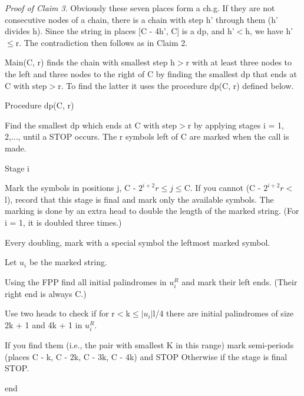 \documentclass[11pt,a4paper]{report}
\begin{document}
\emph{Proof of Claim 3}. Obviously these seven places form a ch.g. If they are not consecutive nodes
of a chain, there is a chain with step h’ through them (h’ divides h). Since the string in
places [C - 4h’, C] is a dp, and h’$<$h, we have h’$\leq$r. The contradiction then follows
as in Claim 2. 

Main(C, r) finds the chain with smallest step h$>$r with at least three nodes to the left
and three nodes to the right of C by finding the smallest dp that ends at C with step$>$r.
To find the latter it uses the procedure dp(C, r) defined below.

Procedure dp(C, r)
\begin{myindentpar}{4em}
Find the smallest dp which ends at C with step$>$r by
applying stages i = 1, 2,..., until a STOP occurs. The r symbols
left of C are marked when the call is made.

Stage i

Mark the symbols in positions j, C - $2^{i+2}r\leq j \leq $C. If you cannot
(C - $2^{i+2}r<$l), record that this stage is final and mark only the
available symbols. The marking is done by an extra head to double
the length of the marked string. (For i = 1, it is doubled three times.)

Every doubling, mark with a special symbol the leftmost marked
symbol.

Let $u_i$ be the marked string.

Using the FPP find all initial palindromes in $u_i^R$ and mark their
left ends. (Their right end is always C.)

Use two heads to check if for r$<$k$\leq |u_i| $l/4 there are initial
palindromes of size 2k + 1 and 4k + 1 in $u_i^R$.

If you find them (i.e., the pair with smallest K in this range)
mark semi-periods (places C - k, C - 2k, C - 3k, C - 4k) and STOP
Otherwise if the stage is final STOP.

\end{myindentpar}

end
\end{document}
